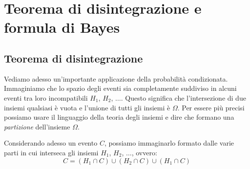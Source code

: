 \section{Teorema di disintegrazione e formula di Bayes}
\label{sec:05_bayes}
\subsection{Teorema di disintegrazione}
Vediamo adesso un'importante applicazione della probabilità condizionata. 
Immaginiamo che lo spazio degli eventi sia completamente suddiviso in alcuni 
eventi tra loro incompatibili $H_1$, $H_2$, $\dots$. Questo significa che 
l'intersezione di due insiemi qualsiasi è vuota e l'unione di tutti gli 
insiemi 
è $\Omega$. Per essere più precisi possiamo usare il linguaggio della teoria 
degli insiemi e dire che formano una \emph{partizione} dell'insieme $\Omega$. 

Considerando adesso un evento $C$, possiamo immaginarlo formato dalle varie 
parti in cui interseca gli insiemi $H_1$, $H_2$, $\dots$, ovvero:
$$ C = (H_1 \cap C) \cup (H_2 \cap C) \cup (H_1 \cap C)$$
\begin{inaccessibleblock}
 \begin{figure}[htpb]
\begin{minipage}[c]{.45\textwidth}
\end{minipage}\hfil
\begin{minipage}[c]{.45\textwidth}
\end{minipage}
\end{figure}
\end{inaccessibleblock}

